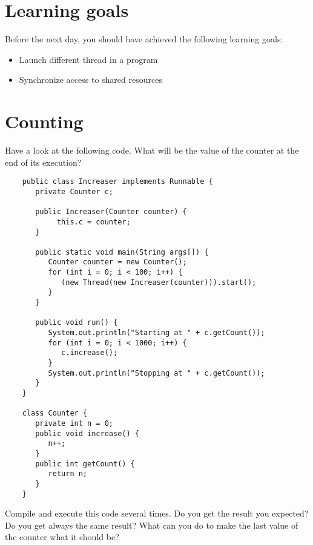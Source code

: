 \documentclass{article}
\begin{document}
\section*{Learning goals}
\label{sec:learning-goals}

Before the next day, you should have achieved the following learning
goals: 

\begin{itemize}
\item Launch different thread in a program
\item Synchronize access to shared resources
\end{itemize}

\section{Counting}
\label{sec:counter}

Have a look at the following code. What will be the value of the
counter at the end of its execution?

\begin{verbatim}
    public class Increaser implements Runnable {
       private Counter c;
    
       public Increaser(Counter counter) {
            this.c = counter;
       }
    
       public static void main(String args[]) {
          Counter counter = new Counter();
          for (int i = 0; i < 100; i++) {
             (new Thread(new Increaser(counter))).start();
          }
       }
    
       public void run() {
          System.out.println("Starting at " + c.getCount());
          for (int i = 0; i < 1000; i++) {
             c.increase();
          }
          System.out.println("Stopping at " + c.getCount());
       }
    }
    
    class Counter {
       private int n = 0;
       public void increase() {
          n++;
       }
       public int getCount() {
          return n;
       }
    }
\end{verbatim}

Compile and execute this code several times. Do you get the result you
expected? Do you get always the same result? What can you do to make
the last value of the counter what it should be?





\end{document}
